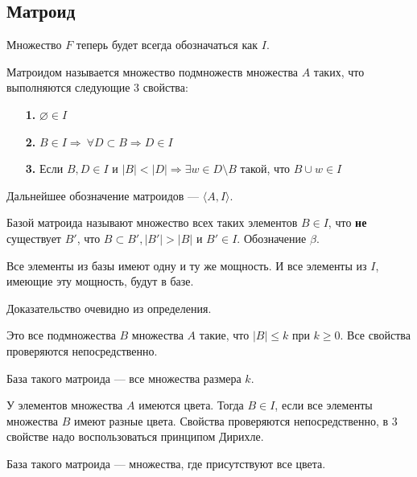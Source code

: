 \documentclass[a4paper, 12pt]{article}
\begin{document}
\subsection{Матроид}

Множество $F$ теперь будет всегда обозначаться как $I$.

Матроидом называется множество подмножеств множества $A$ таких, что выполняются 
следующие 3 свойства:
\begin{itemize}
  \item[{\bf 1.}] $\varnothing \in I$

  \item[{\bf 2.}] $B \in I \Rightarrow \ \forall D \subset B \Rightarrow D \in I$

  \item[{\bf 3.}] Если $B, D \in I$ и $|B| < |D| \Rightarrow \exists w \in D 
  \setminus B$ такой, что $B \cup w \in I$ 
\end{itemize}

Дальнейшее обозначение матроидов --- $\langle A, I\rangle$.

\begin{Def}
  Базой матроида называют множество всех таких элементов $B \in I$, что {\bf не}
   существует $B'$, что $B \subset B', |B'|>|B|$ и $B' \in I$. Обозначение $\beta$.
\end{Def}

\begin{Properties}
  Все элементы из базы имеют одну и ту же мощность. И все элементы из $I$, имеющие
  эту мощность, будут в базе.

  Доказательство очевидно из определения.
\end{Properties}

\begin{Examples}
  Это все подмножества $B$ множества $A$ такие, что
  $|B| \leqslant k$ при $k \geqslant 0$. Все свойства проверяются
  непосредственно. 

  База такого матроида --- все множества 
  размера $k$.
\end{Examples}

\begin{Examples}
  У элементов множества $A$ имеются цвета. Тогда $B \in I$, 
  если все элементы множества $B$ имеют разные цвета. 
  Свойства проверяются непосредственно, в 3 свойстве надо воспользоваться
  принципом Дирихле.

  База такого матроида --- множества, где присутствуют все цвета.
\end{Examples}
\end{document}

